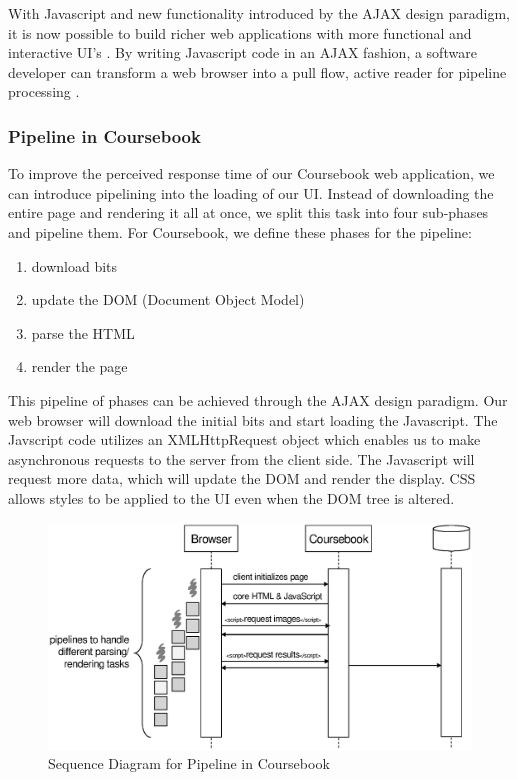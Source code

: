 With Javascript and new functionality introduced by the AJAX design paradigm,
it is now possible to build richer web applications with more functional and
interactive UI's \cite{Crane05}. By writing Javascript code in an AJAX fashion,
a software developer can transform a web browser into a pull flow, active reader
for pipeline processing \cite{Vermeulen95}.

\subsubsection{Pipeline in Coursebook}

To improve the perceived response time of our Coursebook web application, we can
introduce pipelining into the loading of our UI. Instead of downloading the
entire page and rendering it all at once, we split this task into four 
sub-phases and pipeline them. For Coursebook, we define these phases for the
pipeline:

\singlespacing
\begin{enumerate}
  \item download bits
  \item update the DOM (Document Object Model)
  \item parse the HTML
  \item render the page
\end{enumerate}
\doublespacing

This pipeline of phases can be achieved through the AJAX design paradigm. Our
web browser will download the initial bits and start loading the Javascript. The
Javscript code utilizes an XMLHttpRequest object which enables us to make
asynchronous requests to the server from the client side. The Javascript will
request more data, which will update the DOM and render the display. CSS allows
styles to be applied to the UI even when the DOM tree is altered.

\begin{figure}[t]
  \begin{center}
  \includegraphics[width=\textwidth]{images/pipesequence}
  \caption{Sequence Diagram for Pipeline in Coursebook}
  \label{fig:pipesequence}
  \end{center}
\end{figure}


